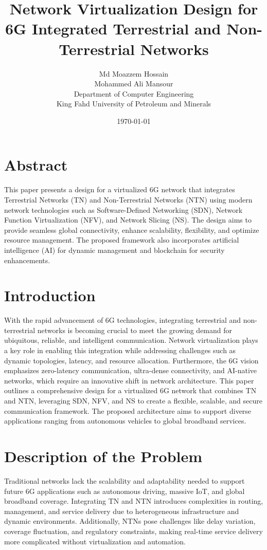 \documentclass[a4paper,12pt]{article}
\title{Network Virtualization Design for 6G Integrated Terrestrial and Non-Terrestrial Networks}
\author{Md Moazzem Hossain \\ Mohammed Ali Mansour \\ Department of Computer Engineering \\ King Fahd University of Petroleum and Minerals}
\date{\today}
\begin{document}
\maketitle

\section*{Abstract}
This paper presents a design for a virtualized 6G network that integrates Terrestrial Networks (TN) and Non-Terrestrial Networks (NTN) using modern network technologies such as Software-Defined Networking (SDN), Network Function Virtualization (NFV), and Network Slicing (NS). The design aims to provide seamless global connectivity, enhance scalability, flexibility, and optimize resource management. The proposed framework also incorporates artificial intelligence (AI) for dynamic management and blockchain for security enhancements.

\section{Introduction}
With the rapid advancement of 6G technologies, integrating terrestrial and non-terrestrial networks is becoming crucial to meet the growing demand for ubiquitous, reliable, and intelligent communication. Network virtualization plays a key role in enabling this integration while addressing challenges such as dynamic topologies, latency, and resource allocation. Furthermore, the 6G vision emphasizes zero-latency communication, ultra-dense connectivity, and AI-native networks, which require an innovative shift in network architecture. This paper outlines a comprehensive design for a virtualized 6G network that combines TN and NTN, leveraging SDN, NFV, and NS to create a flexible, scalable, and secure communication framework. The proposed architecture aims to support diverse applications ranging from autonomous vehicles to global broadband services.

\section{Description of the Problem}
Traditional networks lack the scalability and adaptability needed to support future 6G applications such as autonomous driving, massive IoT, and global broadband coverage. Integrating TN and NTN introduces complexities in routing, management, and service delivery due to heterogeneous infrastructure and dynamic environments. Additionally, NTNs pose challenges like delay variation, coverage fluctuation, and regulatory constraints, making real-time service delivery more complicated without virtualization and automation.
\end{document}
